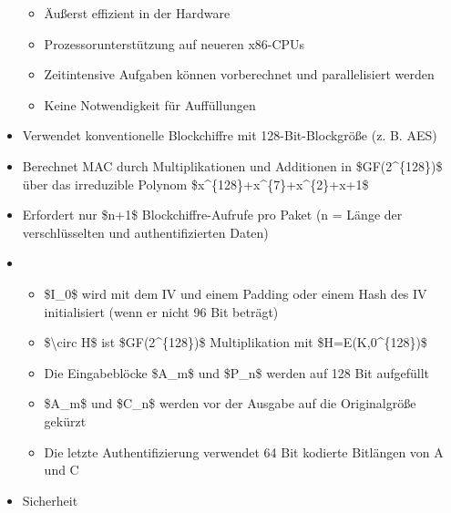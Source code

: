 \documentclass[a4paper]{article}
\begin{document}
\begin{multicols}{3}
\begin{itemize}
              \begin{itemize}
                  \item
                        Äußerst effizient in der Hardware
                  \item
                        Prozessorunterstützung auf neueren x86-CPUs
                  \item
                        Zeitintensive Aufgaben können vorberechnet und parallelisiert werden
                  \item
                        Keine Notwendigkeit für Auffüllungen
              \end{itemize}
        \item
              Verwendet konventionelle Blockchiffre mit 128-Bit-Blockgröße (z. B.
              AES)
        \item
              Berechnet MAC durch Multiplikationen und Additionen in
              \$GF(2\^{}\{128\})\$ über das irreduzible Polynom
              \$x\^{}\{128\}+x\^{}\{7\}+x\^{}\{2\}+x+1\$
        \item
              Erfordert nur \$n+1\$ Blockchiffre-Aufrufe pro Paket (n = Länge der
              verschlüsselten und authentifizierten Daten)
        \item

              \begin{itemize}
                  \item
                        \$I\_0\$ wird mit dem IV und einem Padding oder einem Hash des IV
                        initialisiert (wenn er nicht 96 Bit beträgt)
                  \item
                        \$\textbackslash circ H\$ ist \$GF(2\^{}\{128\})\$ Multiplikation
                        mit \$H=E(K,0\^{}\{128\})\$
                  \item
                        Die Eingabeblöcke \$A\_m\$ und \$P\_n\$ werden auf 128 Bit
                        aufgefüllt
                  \item
                        \$A\_m\$ und \$C\_n\$ werden vor der Ausgabe auf die Originalgröße
                        gekürzt
                  \item
                        Die letzte Authentifizierung verwendet 64 Bit kodierte Bitlängen von
                        A und C
              \end{itemize}
        \item
              Sicherheit


\end{itemize}
\end{multicols}
\end{document}
